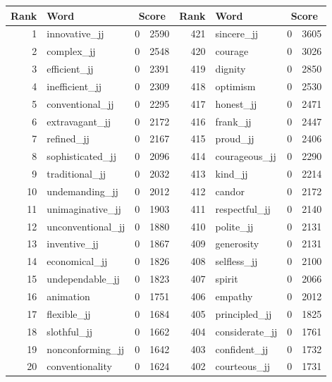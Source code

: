 \begin{table}[tbp]
    \begin{tabular}{| rlr@{.}l | rlr@{.}l |}
    \hline
    \textbf{Rank} & \textbf{Word} & \multicolumn{2}{c|}{\textbf{Score}} & \textbf{Rank} & \textbf{Word} & \multicolumn{2}{c|}{\textbf{Score}} \\
    \hline
    1 & innovative\_jj & 0 & 2590    &    421 & sincere\_jj & 0 & 3605 \\
    2 & complex\_jj & 0 & 2548    &    420 & courage & 0 & 3026 \\
    3 & efficient\_jj & 0 & 2391    &    419 & dignity & 0 & 2850 \\
    4 & inefficient\_jj & 0 & 2309    &    418 & optimism & 0 & 2530 \\
    5 & conventional\_jj & 0 & 2295    &    417 & honest\_jj & 0 & 2471 \\
    6 & extravagant\_jj & 0 & 2172    &    416 & frank\_jj & 0 & 2447 \\
    7 & refined\_jj & 0 & 2167    &    415 & proud\_jj & 0 & 2406 \\
    8 & sophisticated\_jj & 0 & 2096    &    414 & courageous\_jj & 0 & 2290 \\
    9 & traditional\_jj & 0 & 2032    &    413 & kind\_jj & 0 & 2214 \\
    10 & undemanding\_jj & 0 & 2012    &    412 & candor & 0 & 2172 \\
    11 & unimaginative\_jj & 0 & 1903    &    411 & respectful\_jj & 0 & 2140 \\
    12 & unconventional\_jj & 0 & 1880    &    410 & polite\_jj & 0 & 2131 \\
    13 & inventive\_jj & 0 & 1867    &    409 & generosity & 0 & 2131 \\
    14 & economical\_jj & 0 & 1826    &    408 & selfless\_jj & 0 & 2100 \\
    15 & undependable\_jj & 0 & 1823    &    407 & spirit & 0 & 2066 \\
    16 & animation & 0 & 1751    &    406 & empathy & 0 & 2012 \\
    17 & flexible\_jj & 0 & 1684    &    405 & principled\_jj & 0 & 1825 \\
    18 & slothful\_jj & 0 & 1662    &    404 & considerate\_jj & 0 & 1761 \\
    19 & nonconforming\_jj & 0 & 1642    &    403 & confident\_jj & 0 & 1732 \\
    20 & conventionality & 0 & 1624    &    402 & courteous\_jj & 0 & 1731 \\

\end{tabular}
\end{table}
